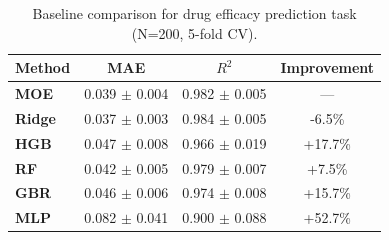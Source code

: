 \begin{table}[htbp]
\centering
\caption{Baseline comparison for drug efficacy prediction task (N=200, 5-fold CV).}
\label{tab:baseline_drug}
\begin{tabular}{lccc}
\toprule
Method & MAE & $R^2$ & Improvement \\
\midrule
\textbf{MOE} & 0.039 $\pm$ 0.004 & 0.982 $\pm$ 0.005 & --- \\
\textbf{Ridge} & 0.037 $\pm$ 0.003 & 0.984 $\pm$ 0.005 & -6.5\% \\
\textbf{HGB} & 0.047 $\pm$ 0.008 & 0.966 $\pm$ 0.019 & +17.7\% \\
\textbf{RF} & 0.042 $\pm$ 0.005 & 0.979 $\pm$ 0.007 & +7.5\% \\
\textbf{GBR} & 0.046 $\pm$ 0.006 & 0.974 $\pm$ 0.008 & +15.7\% \\
\textbf{MLP} & 0.082 $\pm$ 0.041 & 0.900 $\pm$ 0.088 & +52.7\% \\
\bottomrule
\end{tabular}
\end{table}
